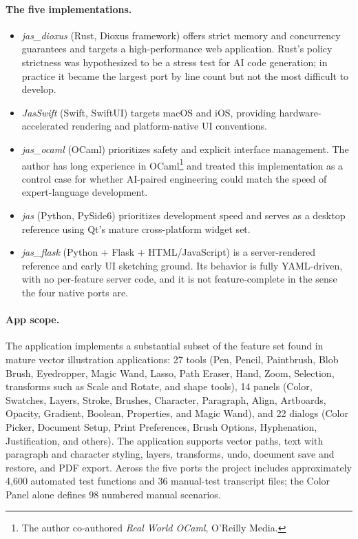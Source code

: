 \documentclass[10pt]{article}
\begin{document}
\paragraph{The five implementations.}
\begin{itemize}[leftmargin=*]
\item \emph{jas\_dioxus} (Rust, Dioxus framework) offers strict memory and
  concurrency guarantees and targets a high-performance web application.
  Rust's policy strictness was hypothesized to be a stress test for AI code
  generation; in practice it became the largest port by line count but not
  the most difficult to develop.
\item \emph{JasSwift} (Swift, SwiftUI) targets macOS and iOS, providing
  hardware-accelerated rendering and platform-native UI conventions.
\item \emph{jas\_ocaml} (OCaml) prioritizes safety and explicit interface
  management. The author has long experience in
  OCaml\footnote{The author co-authored \emph{Real World OCaml}, O'Reilly
  Media.} and treated this implementation as a control case for whether
  AI-paired engineering could match the speed of expert-language
  development.
\item \emph{jas} (Python, PySide6) prioritizes development speed and serves
  as a desktop reference using Qt's mature cross-platform widget set.
\item \emph{jas\_flask} (Python + Flask + HTML/JavaScript) is a
  server-rendered reference and early UI sketching ground. Its behavior is
  fully YAML-driven, with no per-feature server code, and it is not
  feature-complete in the sense the four native ports are.
\end{itemize}

\paragraph{App scope.} The application implements a substantial subset of
the feature set found in mature vector illustration applications: 27 tools
(Pen, Pencil, Paintbrush, Blob Brush, Eyedropper, Magic Wand, Lasso, Path
Eraser, Hand, Zoom, Selection, transforms such as Scale and Rotate, and
shape tools), 14 panels (Color, Swatches, Layers, Stroke, Brushes,
Character, Paragraph, Align, Artboards, Opacity, Gradient, Boolean,
Properties, and Magic Wand), and 22 dialogs (Color Picker, Document Setup,
Print Preferences, Brush Options, Hyphenation, Justification, and others).
The application supports vector paths, text with paragraph and character
styling, layers, transforms, undo, document save and restore, and PDF
export. Across the five ports the project includes approximately 4{,}600
automated test functions and 36 manual-test transcript files; the Color
Panel alone defines 98 numbered manual scenarios.
\end{document}
